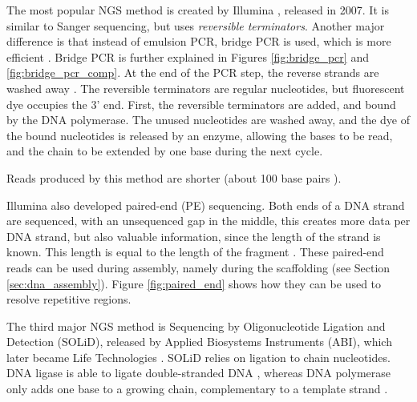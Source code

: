 \documentclass[../main/thesis.tex]{subfiles}
\begin{document}

The most popular NGS method is created by Illumina \cite{most_popular_ngs}, released in 2007.
It is similar to Sanger sequencing, but uses \textit{reversible terminators}.
Another major difference is that instead of emulsion PCR, bridge PCR is used, which is more efficient \cite{ngs_sequencing_atdbio}.
Bridge PCR is further explained in Figures \ref{fig:bridge_pcr} and \ref{fig:bridge_pcr_comp}.
At the end of the PCR step, the reverse strands are washed away \cite{bridge_pcr_reverse}.
The reversible terminators are regular nucleotides, but fluorescent dye occupies the 3' end.
First, the reversible terminators are added, and bound by the DNA polymerase.
The unused nucleotides are washed away, and the dye of the bound nucleotides is released by an enzyme, allowing the bases to be read, and the chain to be extended by one base during the next cycle.

Reads produced by this method are shorter (about 100 base pairs \cite{ngs_history}\cite{pyro_sequencing1}).


Illumina also developed paired-end (PE) sequencing.
Both ends of a DNA strand are sequenced, with an unsequenced gap in the middle, this creates more data per DNA strand, but also valuable information, since the length of the strand is known.
This length is equal to the length of the fragment \cite{paired_end_lengths}.
These paired-end reads can be used during assembly, namely during the scaffolding (see Section \ref{sec:dna_assembly}).
Figure \ref{fig:paired_end} shows how they can be used to resolve repetitive regions.



The third major NGS method is Sequencing by Oligonucleotide Ligation and Detection (SOLiD), released by Applied Biosystems Instruments (ABI), which later became Life Technologies \cite{history_sequencing}.
SOLiD relies on ligation to chain nucleotides.
DNA ligase is able to ligate double-stranded DNA \cite{ngs_sequencing_atdbio}, whereas DNA polymerase only adds one base to a growing chain, complementary to a template strand \cite{dna_replication}.
\end{document}
